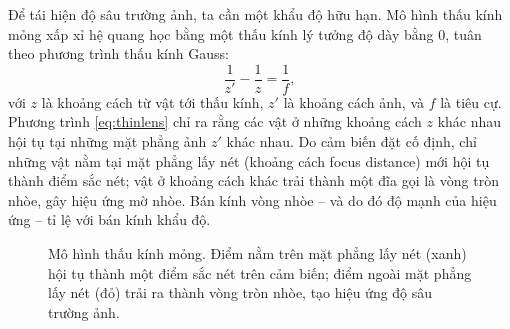 Để tái hiện độ sâu trường ảnh, ta cần một khẩu độ hữu
hạn. Mô hình thấu kính mỏng xấp xỉ hệ
quang học bằng một thấu kính lý tưởng độ dày bằng 0, tuân theo phương trình
thấu kính Gauss:
\begin{equation}
\label{eq:thinlens}
\frac{1}{z'} - \frac{1}{z} = \frac{1}{f},
\end{equation}
với $z$ là khoảng cách từ vật tới thấu kính, $z'$ là khoảng cách ảnh, và $f$ là
tiêu cự. Phương trình \eqref{eq:thinlens} chỉ ra rằng các vật ở những khoảng cách
$z$ khác nhau hội tụ tại những mặt phẳng ảnh $z'$ khác nhau. Do cảm biến đặt cố
định, chỉ những vật nằm tại mặt phẳng lấy nét (khoảng cách
focus distance) mới hội tụ thành điểm sắc nét; vật ở khoảng cách khác trải
thành một đĩa gọi là vòng tròn nhòe, gây hiệu ứng mờ
nhòe. Bán kính vòng nhòe -- và do đó độ mạnh của hiệu ứng -- tỉ lệ với bán kính
khẩu độ.

\begin{figure}[H]
\centering
{}
\caption{Mô hình thấu kính mỏng. Điểm nằm trên mặt phẳng lấy nét (xanh) hội tụ
thành một điểm sắc nét trên cảm biến; điểm ngoài mặt phẳng lấy nét (đỏ) trải ra
thành vòng tròn nhòe, tạo hiệu ứng độ sâu trường ảnh.}
\label{fig:thinlens}
\end{figure}

